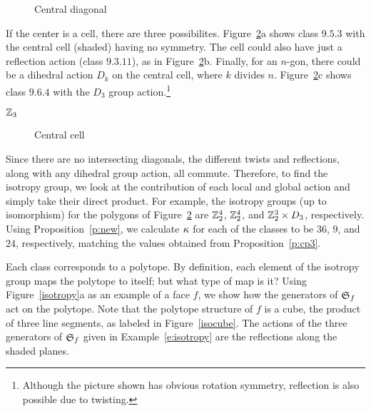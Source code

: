 \documentclass[10pt]{amsart}
\begin{document}
        \begin{figure}[h]
        \caption{Central diagonal}
        \label{centerdiag}
        \end{figure}
        
         If the center is a cell, there are three possibilites.  Figure~\ref{centercell}a shows class $9.5.3$ with the central cell (shaded) having no symmetry. The cell could also have just a reflection action (class $9.3.11$), as in Figure~\ref{centercell}b. Finally, for an $n$-gon, there could be a dihedral action $D_k$ on the central cell, where $k$ divides $n$.  Figure~\ref{centercell}c shows class $9.6.4$ with the $D_3$ group action.\footnote{Although the picture shown has obvious  rotation symmetry, reflection is also possible due to twisting.}
        

        ${\mathbb Z}_3$

        \begin{figure}[h]
            \caption{Central cell}
            \label{centercell}
            \end{figure}
            
            Since there are no intersecting diagonals, the different twists and reflections, along with any dihedral group action, all commute. Therefore, to find the isotropy group, we look at the  contribution of each local and global action and simply take their direct product.  For example, the isotropy groups (up to isomorphism) for the polygons of Figure~\ref{centercell} are ${\mathbb Z}_2^4$, ${\mathbb Z}_2^4$, and ${\mathbb Z}_2^3 \times D_3$, respectively.  Using Proposition~\ref{p:new}, we calculate $\kappa$ for each of the classes to be $36$, $9$, and $24$, respectively, matching the values obtained from Proposition~\ref{p:cp3}.
             
            \begin{rem}
            Each class corresponds to a polytope. By definition, each element of the isotropy group maps the polytope to itself; but what type of map is it? Using Figure~\ref{isotropy}a as an example of a face $f$, we show how the generators of ${\mathfrak S}_f$ act on the polytope.  Note that the polytope structure of $f$ is a cube, the product of three line segments, as labeled in Figure~\ref{isocube}. The actions of the three generators of ${\mathfrak S}_f$ given in Example~\ref{e:isotropy} are the reflections along the shaded planes.
            \end{rem}
            
\end{document}
